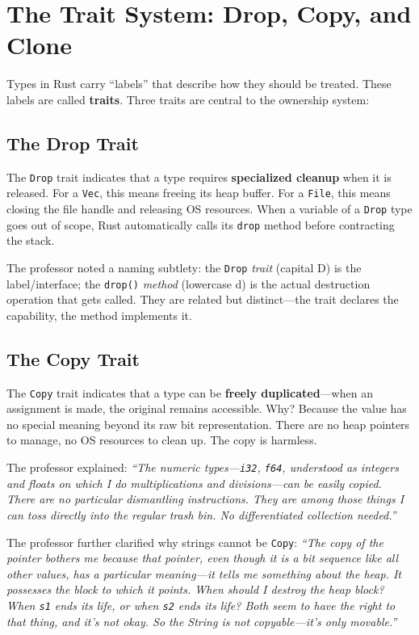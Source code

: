 \section{The Trait System: Drop, Copy, and Clone}

Types in Rust carry ``labels'' that describe how they should be treated. These labels are called \textbf{traits}. Three traits are central to the ownership system:

\subsection{The Drop Trait}

The \texttt{Drop} trait indicates that a type requires \textbf{specialized cleanup} when it is released. For a \texttt{Vec}, this means freeing its heap buffer. For a \texttt{File}, this means closing the file handle and releasing OS resources. When a variable of a \texttt{Drop} type goes out of scope, Rust automatically calls its \texttt{drop} method before contracting the stack.

The professor noted a naming subtlety: the \texttt{Drop} \emph{trait} (capital D) is the label/interface; the \texttt{drop()} \emph{method} (lowercase d) is the actual destruction operation that gets called. They are related but distinct---the trait declares the capability, the method implements it.

\subsection{The Copy Trait}

The \texttt{Copy} trait indicates that a type can be \textbf{freely duplicated}---when an assignment is made, the original remains accessible. Why? Because the value has no special meaning beyond its raw bit representation. There are no heap pointers to manage, no OS resources to clean up. The copy is harmless.

The professor explained: \emph{``The numeric types---\texttt{i32}, \texttt{f64}, understood as integers and floats on which I do multiplications and divisions---can be easily copied. There are no particular dismantling instructions. They are among those things I can toss directly into the regular trash bin. No differentiated collection needed.''}

The professor further clarified why strings cannot be \texttt{Copy}: \emph{``The copy of the pointer bothers me because that pointer, even though it is a bit sequence like all other values, has a particular meaning---it tells me something about the heap. It possesses the block to which it points. When should I destroy the heap block? When \texttt{s1} ends its life, or when \texttt{s2} ends its life? Both seem to have the right to that thing, and it's not okay. So the String is not copyable---it's only movable.''}

